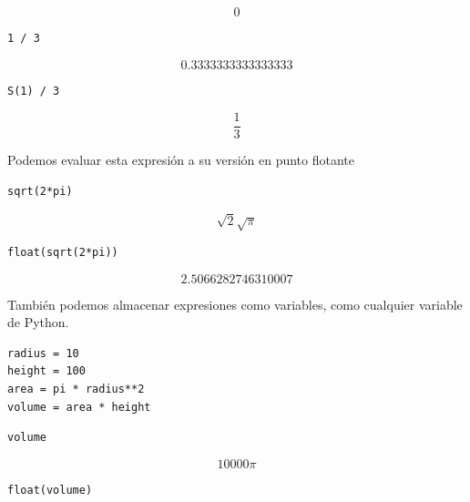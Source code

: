 \[0\]

\begin{listing}[H]
\begin{verbatim}
1 / 3
\end{verbatim}
\end{listing}

\[0.3333333333333333\]

\begin{listing}[H]
\begin{verbatim}
S(1) / 3
\end{verbatim}
\end{listing}

\[\frac{1}{3}\]

Podemos evaluar esta expresión a su versión en punto flotante

\begin{listing}[H]
\begin{verbatim}
sqrt(2*pi)
\end{verbatim}
\end{listing}

\[\sqrt{2} \sqrt{\pi}\]

\begin{listing}[H]
\begin{verbatim}
float(sqrt(2*pi))
\end{verbatim}
\end{listing}

\[2.5066282746310007\]

También podemos almacenar expresiones como variables, como cualquier
variable de Python.

\begin{listing}[H]
\begin{verbatim}
radius = 10
height = 100
area = pi * radius**2
volume = area * height
\end{verbatim}
\end{listing}

\begin{listing}[H]
\begin{verbatim}
volume
\end{verbatim}
\end{listing}

\[10000 \pi\]

\begin{listing}[H]
\begin{verbatim}
float(volume)
\end{verbatim}
\end{listing}

